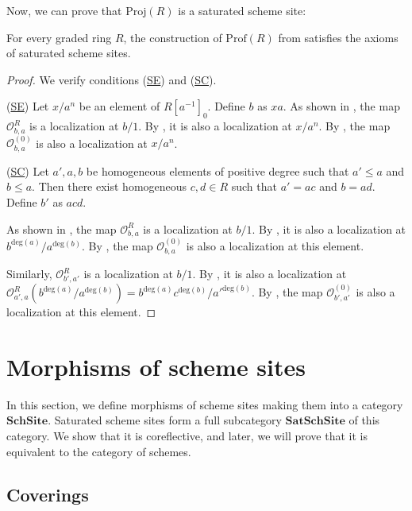 \documentclass[reqno]{amsart}
\newcommand{\axref}[1]{(\hyperref[ax:#1]{#1})}
\theoremstyle{definition}
\theoremstyle{remark}
\numberwithin{figure}{section}
\newcommand{\cat}[1]{\mathbf{#1}}
\renewcommand{\deg}[1]{\mathrm{deg}(#1)}
\begin{document}
Now, we can prove that $\mathrm{Proj}(R)$ is a saturated scheme site:

\begin{prop}
For every graded ring $R$, the construction of $\mathrm{Prof}(R)$ from  satisfies the axioms of saturated scheme sites.
\end{prop}
\begin{proof}
We verify conditions \axref{SE} and \axref{SC}.

\axref{SE}
Let $x/a^n$ be an element of $R[a^{-1}]_0$. Define $b$ as $x a$.
As shown in , the map $\mathcal{O}^R_{b,a}$ is a localization at $b/1$.
By , it is also a localization at $x/a^n$.
By , the map $\mathcal{O}^{(0)}_{b,a}$ is also a localization at $x/a^n$.

\axref{SC}
Let $a',a,b$ be homogeneous elements of positive degree such that $a' \leq a$ and $b \leq a$.
Then there exist homogeneous $c,d \in R$ such that $a' = a c$ and $b = a d$.
Define $b'$ as $a c d$.

As shown in , the map $\mathcal{O}^R_{b,a}$ is a localization at $b/1$.
By , it is also a localization at $b^{\deg{a}}/a^{\deg{b}}$.
By , the map $\mathcal{O}^{(0)}_{b,a}$ is also a localization at this element.

Similarly, $\mathcal{O}^R_{b',a'}$ is a localization at $b/1$.
By , it is also a localization at $\mathcal{O}^R_{a',a}(b^{\deg{a}}/a^{\deg{b}}) = b^{\deg{a}} c^{\deg{b}}/a'^{\deg{b}}$.
By , the map $\mathcal{O}^{(0)}_{b',a'}$ is also a localization at this element.
\end{proof}

\section{Morphisms of scheme sites}
\label{sec:morphisms}

In this section, we define morphisms of scheme sites making them into a category $\cat{SchSite}$.
Saturated scheme sites form a full subcategory $\cat{SatSchSite}$ of this category.
We show that it is coreflective, and later, we will prove that it is equivalent to the category of schemes.

\subsection{Coverings}
\end{document}
